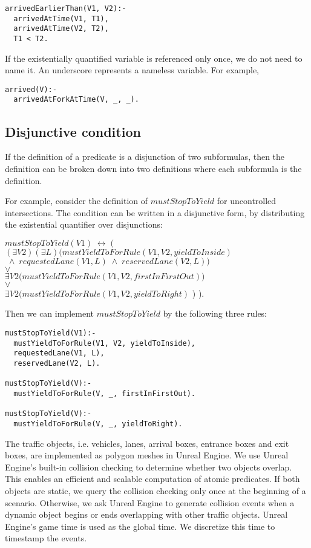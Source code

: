 \begin{verbatim}
arrivedEarlierThan(V1, V2):-
  arrivedAtTime(V1, T1),
  arrivedAtTime(V2, T2),
  T1 < T2.
\end{verbatim}

If the existentially quantified variable is referenced only once,
we do not need to name it.
An underscore represents a nameless variable.
For example,

\begin{verbatim}
arrived(V):-
  arrivedAtForkAtTime(V, _, _).
\end{verbatim}

\subsection{Disjunctive condition}
If the definition of a predicate is
a disjunction of two subformulas,
then the definition can be broken down into two definitions
where each subformula is the definition.

For example,
consider the definition of $mustStopToYield$ for uncontrolled intersections.
The condition can be written in a disjunctive form,
by distributing the existential quantifier over disjunctions:
\begin{center}
    $ mustStopToYield(V1) \; \leftrightarrow \; \Bigg( $ \\
    $ (\exists V2)(\exists L) \Big( mustYieldToForRule(V1, V2, yieldToInside)  $\\
    $ \; \land \; requestedLane(V1, L) \; \land \; reservedLane(V2, L) \Big) $\\
    $ \lor $ \\
    $ \exists V2 \Big( mustYieldToForRule(V1, V2, firstInFirstOut) \Big) $ \\
    $ \lor $ \\
    $ \exists V2 \Big( mustYieldToForRule(V1, V2, yieldToRight) $ \Big) \Bigg).
\end{center}

Then we can implement $mustStopToYield$ 
by the following three rules:
\begin{verbatim}
mustStopToYield(V1):-
  mustYieldToForRule(V1, V2, yieldToInside),
  requestedLane(V1, L),
  reservedLane(V2, L).
  
mustStopToYield(V):-
  mustYieldToForRule(V, _, firstInFirstOut).
  
mustStopToYield(V):-
  mustYieldToForRule(V, _, yieldToRight).
\end{verbatim}


The traffic objects,
i.e. vehicles, lanes, arrival boxes, entrance boxes and exit boxes,
are implemented as polygon meshes in Unreal Engine.
We use Unreal Engine's built-in collision checking
to determine whether two objects overlap.
This enables an efficient and scalable computation of atomic predicates.
If both objects are static,
we query the collision checking only once at the beginning of a scenario.
Otherwise,
we ask Unreal Engine to generate collision events
when a dynamic object begins or ends overlapping with other traffic objects.
Unreal Engine's game time is used as the global time.
We discretize this time to timestamp the events.